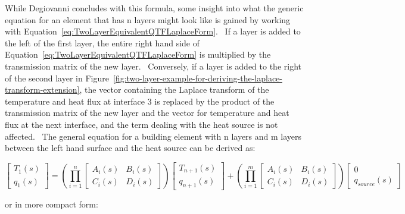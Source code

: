 While Degiovanni concludes with this formula, some insight into what the generic equation for an element that has n layers might look like is gained by working with Equation~\ref{eq:TwoLayerEquivalentQTFLaplaceForm}.~ If a layer is added to the left of the first layer, the entire right hand side of Equation~\ref{eq:TwoLayerEquivalentQTFLaplaceForm} is multiplied by the transmission matrix of the new layer.~ Conversely, if a layer is added to the right of the second layer in Figure~\ref{fig:two-layer-example-for-deriving-the-laplace-transform-extension}, the vector containing the Laplace transform of the temperature and heat flux at interface 3 is replaced by the product of the transmission matrix of the new layer and the vector for temperature and heat flux at the next interface, and the term dealing with the heat source is not affected.~ The general equation for a building element with n layers and m layers between the left hand surface and the heat source can be derived as:

\begin{equation}
\left[ {\begin{array}{ccc}{{T_1}\left( s \right)}\\ {{q_1}\left( s \right)}\end{array}} \right] = \left( {\prod\limits_{i = 1}^n {\left[ {\begin{array}{ccc}{{A_i}\left( s \right)}&{{B_i}\left( s \right)}\\ {{C_i}\left( s \right)}&{{D_i}\left( s \right)}\end{array}} \right]} } \right)\left[ {\begin{array}{ccc}{{T_{n + 1}}\left( s \right)}\\ {{q_{n + 1}}\left( s \right)}\end{array}} \right] + \left( {\prod\limits_{i = 1}^m {\left[ {\begin{array}{ccc}{{A_i}\left( s \right)}&{{B_i}\left( s \right)}\\ {{C_i}\left( s \right)}&{{D_i}\left( s \right)}\end{array}} \right]} } \right)\left[ {\begin{array}{ccc}0\\ {{q_{source}}\left( s \right)}\end{array}} \right]
\end{equation}

or in more compact form:

